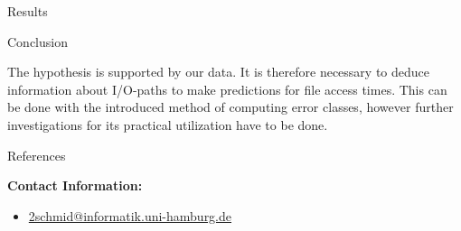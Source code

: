 \documentclass[final]{beamer}
\newlength{\onecolwid}
\begin{document}
\begin{frame}[t]
\begin{columns}[t]
\begin{column}{\onecolwid}
\begin{block}{Results}
\end{block}


\vspace*{-2cm}
\begin{block}{Conclusion}

	The hypothesis is supported by our data.
	It is therefore necessary to deduce information about I/O-paths to make predictions for file access times.
	This can be done with the introduced method of computing error classes, however further investigations for its practical utilization have to be done. 

\end{block}



\begin{block}{References}

\nocite{*} %
\tiny{
\vspace{0.75in}}

\end{block}

	\footnotesize
	
	\vspace*{-2cm}
	\begin{exampleblock}{}
		\vspace*{-1cm}
		\textbf{Contact Information:}
		\vspace*{-0.4cm}
		\begin{itemize}
			\item \href{mailto:2schmid@informatik.uni-hamburg.de}{2schmid@informatik.uni-hamburg.de}
		\end{itemize}
		

\end{exampleblock}
\end{column}
\end{columns}
\end{frame}
\end{document}
